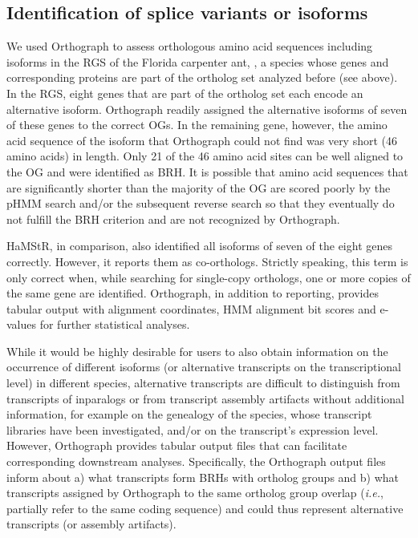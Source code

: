 \subsection{Identification of splice variants or
isoforms}\label{identification-of-splice-variants-or-isoforms}

We used Orthograph to assess orthologous amino acid sequences including
isoforms in the RGS of the Florida carpenter ant, , a species whose genes and corresponding proteins are part
of the ortholog set analyzed before (see above). In the  RGS, eight genes that are part of the ortholog set each
encode an alternative isoform. Orthograph readily assigned the
alternative isoforms of seven of these genes to the correct OGs. In the
remaining gene, however, the amino acid sequence of the isoform that
Orthograph could not find was very short (46 amino acids) in length.
Only 21 of the 46 amino acid sites can be well aligned to the OG and
were identified as BRH. It is possible that amino acid sequences that
are significantly shorter than the majority of the OG are scored poorly
by the pHMM search and/or the subsequent reverse search so that they
eventually do not fulfill the BRH criterion and are not recognized by
Orthograph.

HaMStR, in comparison, also identified all isoforms of seven of the
eight genes correctly. However, it reports them as co-orthologs.
Strictly speaking, this term is only correct when, while searching for
single-copy orthologs, one or more copies of the same gene are
identified. Orthograph, in addition to reporting, provides tabular
output with alignment coordinates, HMM alignment bit scores and e-values
for further statistical analyses.

While it would be highly desirable for users to also obtain information
on the occurrence of different isoforms (or alternative transcripts on
the transcriptional level) in different species, alternative transcripts
are difficult to distinguish from transcripts of inparalogs or from
transcript assembly artifacts without additional information, for
example on the genealogy of the species, whose transcript libraries have
been investigated, and/or on the transcript's expression level. However,
Orthograph provides tabular output files that can facilitate
corresponding downstream analyses. Specifically, the Orthograph output
files inform about a) what transcripts form BRHs with ortholog groups
and b) what transcripts assigned by Orthograph to the same ortholog
group overlap (\emph{i.e.}, partially refer to the same coding sequence)
and could thus represent alternative transcripts (or assembly
artifacts).

